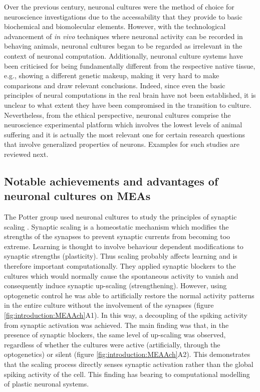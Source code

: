     Over the previous century, neuronal cultures were the method of choice for neuroscience investigations due to the accessability that they provide to basic biochemical and biomolecular elements. However, with the technological advancement of \textit{in vivo} techniques where neuronal activity can be recorded in behaving animals, neuronal cultures began to be regarded as irrelevant in the context of neuronal computation. Additionally, neuronal culture systems have been criticised for being fundamentally different from the respective native tissue, e.g., showing a different genetic makeup, making it very hard to make comparisons and draw relevant conclusions. Indeed, since even the basic principles of neural computations in the real brain have not been established, it is unclear to what extent they have been compromised in the transition to culture. Nevertheless, from the ethical perspective, neuronal cultures comprise the neuroscience experimental platform which involves the lowest levels of animal suffering and it is actually the most relevant one for certain research questions that involve generalized properties of neurons. Examples for such studies are reviewed next.

    \subsection{Notable achievements and advantages of neuronal cultures on MEAs}
	\label{sec:introduction:achievements}

    The Potter group used neuronal cultures to study the principles of synaptic scaling \cite{fong2015upward}. Synaptic scaling is a homeostatic mechanism which modifies the strengths of the synapses to prevent synaptic currents from becoming too extreme. Learning is thought to involve behaviour dependent modifications to synaptic strengths (plasticity). Thus scaling probably affects learning and is therefore important computationally. They applied synaptic blockers to the cultures which would normally cause the spontaneous activity to vanish and consequently induce synaptic up-scaling (strengthening). However, using optogenetic control he was able to artificially restore the normal activity patterns in the entire culture without the involvement of the synapses (figure \ref{fig:introduction:MEAAch}A1). In this way, a decoupling of the spiking activity from synaptic activation was achieved. The main finding was that, in the presence of synaptic blockers, the same level of up-scaling was observed, regardless of whether the cultures were active (artificially, through the optogenetics) or silent (figure \ref{fig:introduction:MEAAch}A2). This demonstrates that the scaling process directly senses synaptic activation rather than the global spiking activity of the cell. This finding has bearing to computational modelling of plastic neuronal systems.

